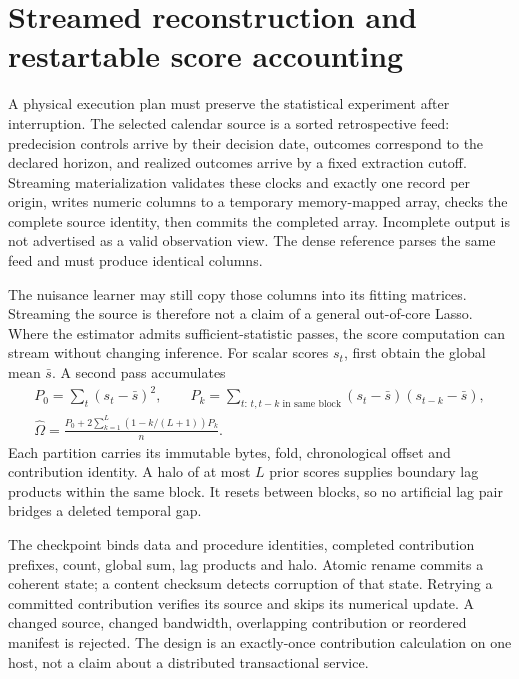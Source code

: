 \section{Streamed reconstruction and restartable score accounting}
\label{c7:restartable}
A physical execution plan must preserve the statistical experiment after
interruption. The selected calendar source is a sorted retrospective feed:
predecision controls arrive by their decision date, outcomes correspond to
the declared horizon, and realized outcomes arrive by a fixed extraction
cutoff. Streaming materialization validates these clocks and exactly one
record per origin, writes numeric columns to a temporary memory-mapped array,
checks the complete source identity, then commits the completed array.
Incomplete output is not advertised as a valid observation view. The dense
reference parses the same feed and must produce identical columns.

The nuisance learner may still copy those columns into its fitting matrices.
Streaming the source is therefore not a claim of a general out-of-core Lasso.
Where the estimator admits sufficient-statistic passes, the score computation
can stream without changing inference. For scalar scores $s_t$, first obtain
the global mean $\bar s$. A second pass accumulates
\begin{align*}
 P_0=\sum_t(s_t-\bar s)^2,\qquad
 P_k=\sum_{t:\,t,t-k\text{ in same block}}
               (s_t-\bar s)(s_{t-k}-\bar s),\\
 \widehat\Omega=\frac{P_0+2\sum_{k=1}^{L}(1-k/(L+1))P_k}{n}.
\end{align*}
Each partition carries its immutable bytes, fold, chronological offset and
contribution identity. A halo of at most $L$ prior scores supplies boundary
lag products within the same block. It resets between blocks, so no artificial
lag pair bridges a deleted temporal gap.

The checkpoint binds data and procedure identities, completed contribution
prefixes, count, global sum, lag products and halo. Atomic rename commits a
coherent state; a content checksum detects corruption of that state. Retrying
a committed contribution verifies its source and skips its numerical update.
A changed source, changed bandwidth, overlapping contribution or reordered
manifest is rejected. The design is an exactly-once contribution calculation
on one host, not a claim about a distributed transactional service.

